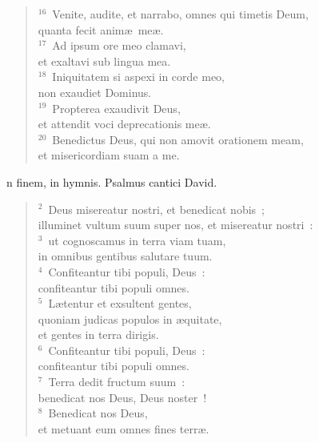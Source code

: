 \begin{verse}
${}^{16}$~Venite, audite, et narrabo, omnes qui timetis Deum,\\ quanta fecit anim\ae\ me\ae .\\
${}^{17}$~Ad ipsum ore meo clamavi,\\ et exaltavi sub lingua mea.\\
${}^{18}$~Iniquitatem si aspexi in corde meo,\\ non exaudiet Dominus.\\
${}^{19}$~Propterea exaudivit Deus,\\ et attendit voci deprecationis me\ae .\\
${}^{20}$~Benedictus Deus, qui non amovit orationem meam,\\ et misericordiam suam a me.\end{verse}



\bchapter[Psalm]
n finem, in hymnis. Psalmus cantici David.
\begin{verse}${}^{2}$~Deus misereatur nostri, et benedicat nobis~;\\ illuminet vultum suum super nos, et misereatur nostri~:\\
${}^{3}$~ut cognoscamus in terra viam tuam,\\ in omnibus gentibus salutare tuum.\\
${}^{4}$~Confiteantur tibi populi, Deus~:\\ confiteantur tibi populi omnes.\\
${}^{5}$~L\ae tentur et exsultent gentes,\\ quoniam judicas populos in \ae quitate,\\ et gentes in terra dirigis.\\
${}^{6}$~Confiteantur tibi populi, Deus~:\\ confiteantur tibi populi omnes.\\
${}^{7}$~Terra dedit fructum suum~:\\ benedicat nos Deus, Deus noster~!\\
${}^{8}$~Benedicat nos Deus,\\ et metuant eum omnes fines terr\ae .\end{verse}



